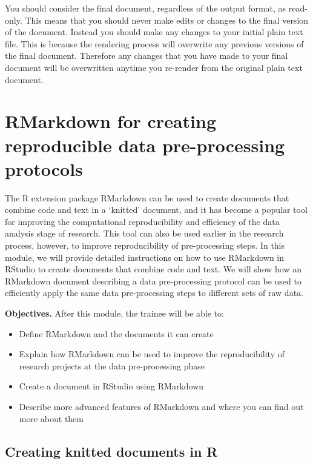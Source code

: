 \documentclass[]{tufte-book}
\providecommand{\tightlist}{%
  \setlength{\itemsep}{0pt}\setlength{\parskip}{0pt}}
\begin{document}
You should consider the final document, regardless of the output format, as
read-only. This means that you should never make edits or changes to the final
version of the document. Instead you should make any changes to your initial
plain text file. This is because the rendering process will overwrite any
previous versions of the final document. Therefore any changes that you have
made to your final document will be overwritten anytime you re-render from the
original plain text document.

\section{RMarkdown for creating reproducible data pre-processing protocols}\label{module19}

The R extension package RMarkdown can be used to create documents that combine
code and text in a `knitted' document, and it has become a popular tool for
improving the computational reproducibility and efficiency of the data analysis
stage of research. This tool can also be used earlier in the research process,
however, to improve reproducibility of pre-processing steps. In this module, we
will provide detailed instructions on how to use RMarkdown in RStudio to create
documents that combine code and text. We will show how an RMarkdown document
describing a data pre-processing protocol can be used to efficiently apply the
same data pre-processing steps to different sets of raw data.

\textbf{Objectives.} After this module, the trainee will be able to:

\begin{itemize}
\tightlist
\item
  Define RMarkdown and the documents it can create
\item
  Explain how RMarkdown can be used to improve the reproducibility of research
  projects at the data pre-processing phase
\item
  Create a document in RStudio using RMarkdown
\item
  Describe more advanced features of RMarkdown and where you can find out more
  about them
\end{itemize}

\subsection{Creating knitted documents in R}\label{creating-knitted-documents-in-r}
\end{document}
